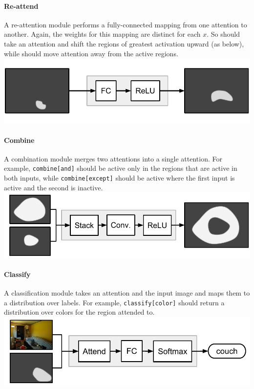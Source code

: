 \documentclass[10pt,twocolumn,letterpaper]{article}
\begin{document}
\paragraph{Re-attend}

A re-attention module  performs a fully-connected mapping from one attention to another. Again, the weights for this mapping are distinct for each $x$. So  should take an attention and shift the regions of greatest activation upward (as below), while  should move attention away from the active regions.\\[1em]
\includegraphics[width=\columnwidth]{fig/re-attend}

\paragraph{Combine}

A combination module  merges two attentions into a single attention. For example, {\small\tt combine[and]} should be active only in the regions that are active in both inputs, while {\small\tt{combine[except]}} should be active where the first input is active and the second is inactive.\\[1em]
\includegraphics[width=\columnwidth]{fig/combine}

\paragraph{Classify}

A classification module  takes an attention and the input image and maps them to a distribution over labels. For example, {\small\tt classify[color]} should return a distribution over colors for the region attended to.\\[1em]
\includegraphics[width=\columnwidth]{fig/classify}
\end{document}
